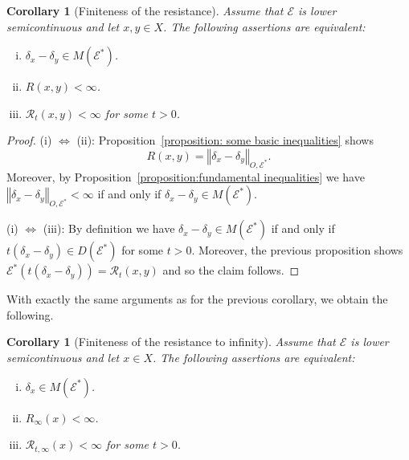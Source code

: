 \documentclass[a4paper,11pt,reqno]{amsart}
\newtheorem{corollary}[lemma]{Corollary}
\theoremstyle{definition}
\numberwithin{equation}{section}
\newcommand{\cR}{{\mathcal R}}
\newcommand{\cE}{{\mathcal E}}
\newcommand{\av}[1]{\left\Vert #1\right\Vert}
\newcommand{\1}{\mathds{1}}
\begin{document}
\begin{corollary}[Finiteness of the resistance]\label{coro:finiteness of resistance}
 Assume that $\cE$ is lower semicontinuous and let  $x,y \in X$. The following assertions are equivalent: 
 \begin{enumerate}[(i)]
  \item $\delta_{x} - \delta_y \in M(\cE^*)$. 
  \item $R(x,y)  < \infty$. 
  \item   $\cR_t(x,y) < \infty$ for some $t > 0$. 
 \end{enumerate}
%
 \end{corollary}
\begin{proof}
 (i) $\Leftrightarrow$ (ii): Proposition~\ref{proposition: some basic inequalities} shows 
 $$R(x,y) = \av{\delta_{x} - \delta_y}_{O,\cE^*}.$$
 Moreover, by Proposition~\ref{proposition:fundamental inequalities} we have $\av{\delta_{x} - \delta_y}_{O,\cE^*} < \infty$ if and only if $\delta_{x} - \delta_y \in M(\cE^*)$. 
 
 (i) $\Leftrightarrow$ (iii): By definition we have $\delta_{x} - \delta_y \in M(\cE^*)$ if and only if $t (\delta_{x} - \delta_y) \in D(\cE^*)$ for some $t > 0$. Moreover, the previous proposition shows $\cE^*(t (\delta_{x} - \delta_y)) = \cR_t(x,y)$ and so the claim follows.
%  
%  
%  
%  
\end{proof}

With exactly the same arguments as for the previous corollary, we obtain the following. 

\begin{corollary}[Finiteness of the resistance to infinity]\label{coro:finiteness of resistanceII}
 Assume that $\cE$ is lower semicontinuous and let  $x \in X$. The following assertions are equivalent: 
 \begin{enumerate}[(i)]
  \item $\delta_{x} \in M(\cE^*)$. 
  \item $R_\infty(x)  < \infty$. 
  \item  $\cR_{t,\infty}(x) < \infty$ for some $t > 0$. 
 \end{enumerate}
%
 \end{corollary}
\end{document}
